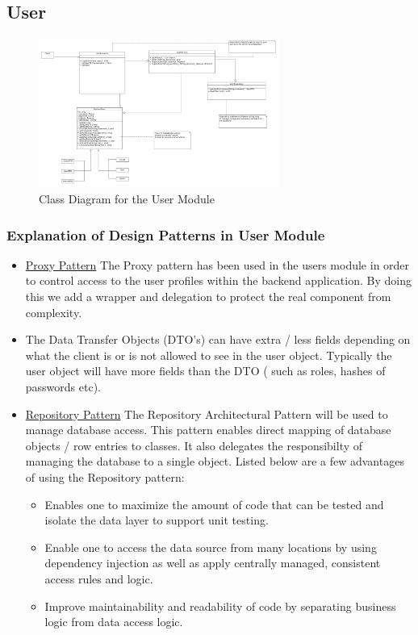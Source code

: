 \documentclass[runningheads,a4paper]{article}
\begin{document}
\subsection {User}

\begin{figure}[H]
   	\centering
   	\includegraphics[width=0.7\textwidth]{User_Class_Diagrams.png}
   	\caption{Class Diagram for the User Module}
\end{figure}
\subsubsection {Explanation of Design Patterns in User Module}
\begin{itemize}
\item \underline{Proxy Pattern} The Proxy pattern has been used in the users module in order to control access to the user profiles within the backend application. By doing this we add a wrapper and delegation to protect the real component from complexity. 

\item The Data Transfer Objects (DTO's)  can have extra / less fields depending on what the client is or is not allowed to see in the user object. Typically the user object will have more fields than the DTO ( such as roles, hashes of passwords etc). 

\item \underline{Repository Pattern} The Repository Architectural Pattern will be used to manage database access. This pattern enables direct mapping of database objects / row entries to classes. It also delegates the responsibilty of managing the database to a single object. Listed below are a few advantages of using the Repository pattern:
	\begin{itemize}
		\item Enables one to maximize the amount of code that can be tested and isolate the data layer to support unit testing. 
		\item Enable one to access the data source from many locations by using dependency injection as well as apply centrally managed, consistent access rules and logic.
		\item Improve maintainability and readability of code by separating business logic from data access logic.  
	\end{itemize} 
\end{itemize}
\end{document}
